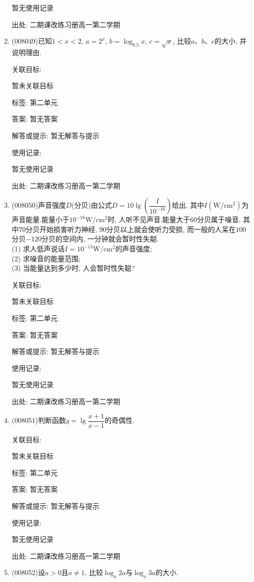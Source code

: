 \documentclass[10pt,a4paper]{article}
\begin{document}
\begin{enumerate}[1.]
暂无使用记录


出处: 二期课改练习册高一第二学期
\item { (008049)}已知$1<x<2$, $a=2^x$, $b=\log _{0.5}x$, $c=\sqrt x$, 比较$a$、$b$、$c$的大小, 并说明理由.


关联目标:

暂未关联目标



标签: 第二单元

答案: 暂无答案

解答或提示: 暂无解答与提示

使用记录:

暂无使用记录


出处: 二期课改练习册高一第二学期
\item { (008050)}声音强度$D$(分贝)由公式$D=10\lg (\dfrac I{10^{-16}})$给出, 其中$I(\text{W}/\text{cm}^2)$为声音能量.能量小于$10^{-16}\text{W}/\text{cm}^2$时, 人听不见声音.能量大于$60$分贝属于噪音, 其中$70$分贝开始损害听力神经, $90$分贝以上就会使听力受损, 而一般的人呆在$100$分贝$-120$分贝的空间内, 一分钟就会暂时性失聪.\\
(1) 求人低声说话$I=10^{-13}\text{W}/\text{cm}^2$的声音强度;\\
(2) 求噪音的能量范围;\\
(3) 当能量达到多少时, 人会暂时性失聪?


关联目标:

暂未关联目标



标签: 第二单元

答案: 暂无答案

解答或提示: 暂无解答与提示

使用记录:

暂无使用记录


出处: 二期课改练习册高一第二学期
\item { (008051)}判断函数$y=\lg\dfrac{x+1}{x-1}$的奇偶性.


关联目标:

暂未关联目标



标签: 第二单元

答案: 暂无答案

解答或提示: 暂无解答与提示

使用记录:

暂无使用记录


出处: 二期课改练习册高一第二学期
\item { (008052)}设$a>0$且$a\ne 1$, 比较$\log _a2a$与$\log _a3a$的大小.



\end{enumerate}
\end{document}
